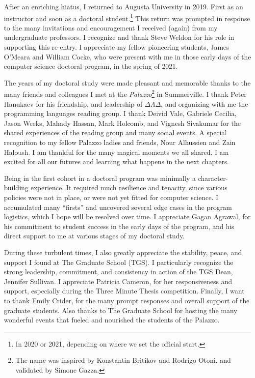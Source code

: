 After an enriching hiatus, I returned to Augusta University in 2019.
First as an instructor and soon as a doctoral student.\footnote{In 2020 or 2021, depending on where we set the official start.}
This return was prompted in response to the many invitations and encouragement I received (again) from my undergraduate professors.
I recognize and thank Steve Weldon for his role in supporting this re-entry.
I appreciate my fellow pioneering students, James O'Meara and William Cocke, who were present with me in those early days of the computer science doctoral program, in the spring of 2021.

The years of my doctoral study were made pleasant and memorable thanks to the many friends and colleagues I met at the \emph{Palazzo}\footnote{The name was inspired by Konstantin Britikov and Rodrigo Otoni, and validated by Simone Gazza.} in Summerville.
I thank Peter Hanukaev for his friendship, and leadership of $\Delta\Lambda\Delta$, and organizing with me the programming languages reading group.
I thank Deivid Vale, Gabriele Cecilia, Jason Weeks, Mahady Hassan, Mark Holcomb, and Vignesh Sivakumar for the shared experiences of the reading group and many social events.
A special recognition to my fellow Palazzo ladies and friends, Nour Alhussien and Zain Haloush.
I am thankful for the many magical moments we all shared.
I am excited for all our futures and learning what happens in the next chapters.

Being in the first cohort in a doctoral program was minimally a character-building experience.
It required much resilience and tenacity, since various policies were not in place, or were not yet fitted for computer science.
I accumulated many \enquote{firsts} and uncovered several edge cases in the program logistics, which I hope will be resolved over time.
I appreciate Gagan Agrawal, for his commitment to student success in the early days of the program, and his direct support to me at various stages of my doctoral study.

During these turbulent times, I also greatly appreciate the stability, peace, and support I found at The Graduate School (TGS).
I particularly recognize the strong leadership, commitment, and consistency in action of the TGS Dean, Jennifer Sullivan.
I appreciate Patricia Cameron, for her responsiveness and support, especially during the Three Minute Thesis competition.
Finally, I want to thank Emily Crider, for the many prompt responses and overall support of the graduate students.
Also thanks to The Graduate School for hosting the many wonderful events that fueled and nourished the students of the Palazzo.

